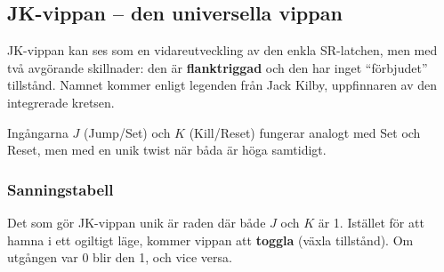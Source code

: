 \documentclass[
  swedish,
  letterpaper,
  oneside,
  openany]{book}
\begin{document}
\subsection{JK-vippan -- den universella
vippan}\label{jk-vippan-den-universella-vippan}

JK-vippan kan ses som en vidareutveckling av den enkla SR-latchen, men
med två avgörande skillnader: den är \textbf{flanktriggad} och den har
inget ``förbjudet'' tillstånd. Namnet kommer enligt legenden från Jack
Kilby, uppfinnaren av den integrerade kretsen.

Ingångarna \(J\) (Jump/Set) och \(K\) (Kill/Reset) fungerar analogt med
Set och Reset, men med en unik twist när båda är höga samtidigt.

\subsubsection{Sanningstabell}\label{sanningstabell}

Det som gör JK-vippan unik är raden där både \(J\) och \(K\) är 1.
Istället för att hamna i ett ogiltigt läge, kommer vippan att
\textbf{toggla} (växla tillstånd). Om utgången var 0 blir den 1, och
vice versa.
\end{document}
